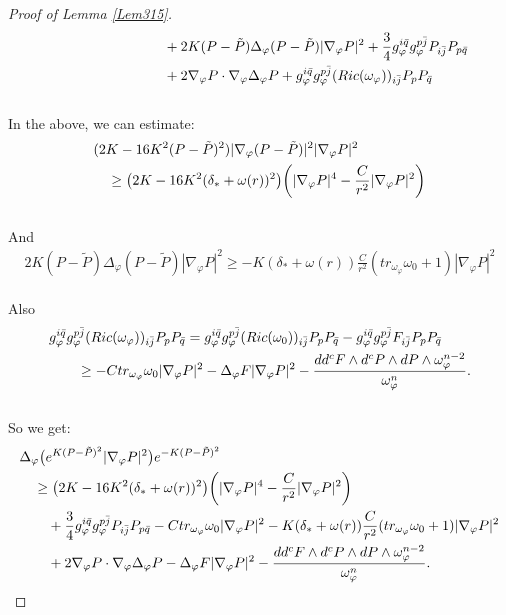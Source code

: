 \documentclass[10pt,a4paper]{amsart}
\begin{document}
\begin{proof}[Proof of Lemma \ref{Lem315}]
\begin{align}
	&\qquad\qquad\qquad\qquad +2K(P-\tilde P)\Delta_{\varphi}(P-\tilde P)|\nabla_{\varphi}P|^2 +\frac{3}{4}g_{\varphi}^{i\bar{q}}g_{\varphi}^{p\bar{j}}P_{i\bar{j}}P_{p\bar{q}} \notag\\
	&\qquad\qquad\qquad\qquad +2\nabla_{\varphi}P\cdot \nabla_{\varphi}\Delta_{\varphi}P+g_{\varphi}^{i\bar{q}}g_{\varphi}^{p\bar{j}}(Ric(\omega_{\varphi}))_{i\bar{j}}P_pP_{\bar{q}} 
\end{align}\\
In the above,  we can estimate: 
\begin{align}
	&(2K-16K^2(P-\tilde P)^2)|\nabla_\varphi(P-\tilde P)|^2 |\nabla_{\varphi}P|^2 \notag\\
	&\quad  \ge  \big(2K-16K^2(\delta_*+\omega(r))^2 \big)\bigg( |\nabla_\varphi P|^4 -\frac{C}{r^2}|\nabla_\varphi P|^2 \bigg)
\end{align}\\
And
\begin{align}
	2K(P-\tilde P)\Delta_{\varphi}(P-\tilde P)|\nabla_{\varphi}P|^2\ge  -K(\delta_*+\omega(r)) \frac{C}{r^2} (tr_{\omega_{\varphi}}\omega_0+1)|\nabla_\varphi P|^2
\end{align}\\
Also
\begin{align}
	& g_{\varphi}^{i\bar{q}}g_{\varphi}^{p\bar{j}}(Ric(\omega_{\varphi}))_{i\bar{j}}P_pP_{\bar{q}} =g_{\varphi}^{i\bar{q}}g_{\varphi}^{p\bar{j}}(Ric(\omega_0))_{i\bar{j}}P_pP_{\bar{q}} - g_{\varphi}^{i\bar{q}}g_{\varphi}^{p\bar{j}}F_{i\bar{j}}P_pP_{\bar{q}} \notag \\
	&\qquad \ge  -C tr_{\omega_{\varphi}}\omega_0|\nabla_{\varphi}P|^2 - \Delta_{\varphi}F|\nabla_{\varphi}P|^2 - \frac{dd^cF\wedge d^c P\wedge d P\wedge \omega_{\varphi}^{n-2}}{\omega_{\varphi}^n}.
\end{align}\\
So we get:
\begin{align}
	&\Delta_{\varphi}\big(e^{K(P-\tilde P)^2}|\nabla_{\varphi}P|^2\big)e^{-K(P-\tilde P)^2}  \notag\\
	&\quad  \ge  \big(2K-16K^2(\delta_*+\omega(r))^2 \big)\bigg( |\nabla_\varphi P|^4 -\frac{C}{r^2}|\nabla_\varphi P|^2 \bigg)   \notag \\
	&\qquad +\frac{3}{4}g_{\varphi}^{i\bar{q}}g_{\varphi}^{p\bar{j}}P_{i\bar{j}}P_{p\bar{q}} -C tr_{\omega_{\varphi}}\omega_0|\nabla_{\varphi}P|^2 -K(\delta_*+\omega(r)) \frac{C}{r^2} (tr_{\omega_{\varphi}}\omega_0+1)|\nabla_\varphi P|^2 \notag\\
	&\qquad +2\nabla_{\varphi}P\cdot \nabla_{\varphi}\Delta_{\varphi}P - \Delta_{\varphi}F|\nabla_{\varphi}P|^2 - \frac{dd^cF\wedge d^cP\wedge dP\wedge \omega_{\varphi}^{n-2}}{\omega_{\varphi}^n}.

\end{align}
\end{proof}
\end{document}
